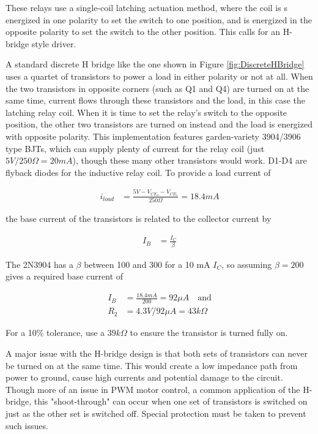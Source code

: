 		These relays use a single-coil latching actuation method, where the coil is s energized in one polarity to set the switch to one position, and is energized in the opposite polarity to set the switch to the other position. This calls for an H-bridge style driver.


		A standard discrete H bridge like the one shown in Figure \ref{fig:DiscreteHBridge} uses a quartet of transistors to power a load in either polarity or not at all.  When the two transistors in opposite corners (such as Q1 and Q4) are turned on at the same time, current flows through these transistors and the load, in this case the latching relay coil.  When it is time to set the relay's switch to the opposite position, the other two transistors are turned on instead and the load is energized with opposite polarity.  This implementation features garden-variety 3904/3906 type BJTs, which can supply plenty of current for the relay coil (just $5V/250\Omega = 20 mA$), though these many other transistors would work.  D1-D4 are flyback diodes for the inductive relay coil.  To provide a load current of 

		\begin{align}
			i_{load} &= \frac{5V - V_{CE_4} - V_{CE_1}}{250 \Omega} = 18.4 mA
		\end{align}

		the base current of the transistors is related to the collector current by

		\begin{align}
			I_B &= \frac{I_C}{\beta}
		\end{align}

		The 2N3904 has a $\beta$ between 100 and 300 for a 10 mA $I_C$, so assuming $\beta = 200$ gives a required base current of

		\begin{align}
			I_B &= \frac{18.4mA}{200} = 92 \mu A \quad \text{and} \\
			R_2 &= 4.3V/92\mu A = 43 k\Omega
		\end{align}

		For a 10\% tolerance, use a $39k\Omega$ to ensure the transistor is turned fully on.

		A major issue with the H-bridge design is that both sets of transistors can never be turned on at the same time.  This would create a low impedance path from power to ground, cause high currents and potential damage to the circuit.  Though more of an issue in PWM motor control, a common application of the H-bridge, this "shoot-through" can occur when one set of transistors is switched on just as the other set is switched off.  Special protection must be taken to prevent such issues.

